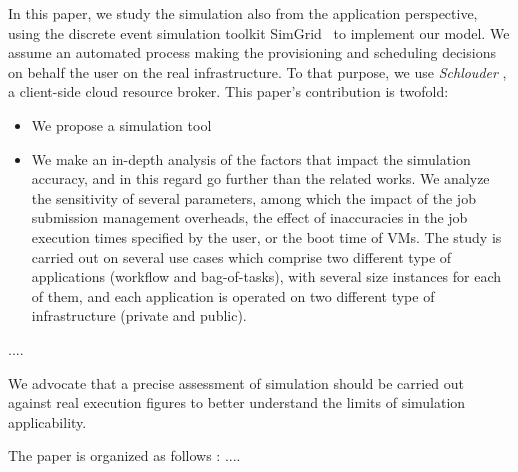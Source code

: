 \documentclass[parallelisme]{compas2017}
\begin{document}
In this  paper, we study the  simulation also from the  application perspective,
using  the   discrete  event  simulation  toolkit   SimGrid~\cite{simgrid08}  to
implement our model. We assume an  automated process making the provisioning and
scheduling decisions  on behalf the  user on  the real infrastructure.   To that
purpose,  we   use  \emph{Schlouder}  \cite{},  a   client-side  cloud  resource
broker. This  paper's contribution  is twofold:
\begin{itemize}
\item We propose a simulation tool
\item We make an  in-depth analysis  of the
factors that impact the simulation accuracy,  and in this regard go further than
the related works. We analyze the sensitivity of several parameters, among which
the  impact  of   the  job  submission  management  overheads,   the  effect  of
inaccuracies in the job execution times specified  by the user, or the boot time
of  VMs.  The  study is  carried out  on several  use cases  which comprise  two
different type  of applications (workflow  and bag-of-tasks), with  several size
instances for  each of them, and  each application is operated  on two different
type of infrastructure (private and public).
\end{itemize}

....

We advocate  that a precise assessment  of simulation
should be  carried out against real  execution figures to better  understand the
limits  of simulation  applicability. 

The paper is organized as follows : ....


\begin{comment}
These scheduling algorithms of Schlouder have been reimplemented in a simulation
system,  based on  the simulation  toolkit SimGrid~\cite{simgrid08}.   Our study
aims to isolate the different  parameters that influence the simulation accuracy
and what  degree of divergence  between real  execution and simulation  might be
expected in each case.
\end{comment}
\end{document}
